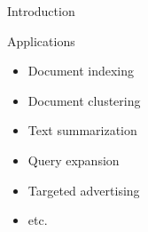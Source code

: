 \begin{frame}{Introduction}
{      \begin{block}{Applications}
        \begin{multicols}{2}
          \begin{itemize}
            \item{Document indexing}
            \item{Document clustering}
            \item{Text summarization}
            \item{Query expansion}
            \item{Targeted advertising}
            \item{etc.}
          \end{itemize}
        \end{multicols}
      \end{block}
    }
  \end{frame}

